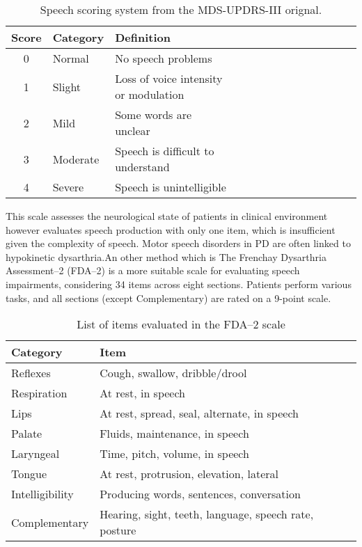 \begin{table}[ht]
    \centering
    \begin{tabular}{c|l|l|r|r|r|r|r|r|r|r|r|r|r}
        Score & Category & Definition                            \\\hline
        0     & Normal   & No speech problems                    \\
        1     & Slight   & Loss of voice intensity or modulation \\
        2     & Mild     & Some words are unclear                \\
        3     & Moderate & Speech is difficult to understand     \\
        4     & Severe   & Speech is unintelligible
    \end{tabular}
    \caption{\label{tab:widgets} Speech scoring system from the MDS-UPDRS-III orignal.}
\end{table}
This scale assesses the neurological state of patients in clinical environment however evaluates speech production with only one item, which is insufficient given the complexity of speech. Motor speech disorders in PD are often linked to hypokinetic dysarthria.An other method which is The Frenchay Dysarthria Assessment–2 (FDA–2) \cite{enderby2008fda} is a more suitable scale for evaluating speech impairments, considering 34 items across eight sections. Patients perform various tasks, and all sections (except Complementary) are rated on a 9-point scale.
\begin{table}[ht]
    \centering
    \begin{tabular}{l|l}
        Category        & Item                                                  \\\hline
        Reflexes        & Cough, swallow, dribble/drool                         \\
        Respiration     & At rest, in speech                                    \\
        Lips            & At rest, spread, seal, alternate, in speech           \\
        Palate          & Fluids, maintenance, in speech                        \\
        Laryngeal       & Time, pitch, volume, in speech                        \\
        Tongue          & At rest, protrusion, elevation, lateral               \\
        Intelligibility & Producing words, sentences, conversation              \\
        Complementary   & Hearing, sight, teeth, language, speech rate, posture
    \end{tabular}
    \caption{\label{tab:widgets}  List of items evaluated in the FDA–2 scale}
\end{table}
